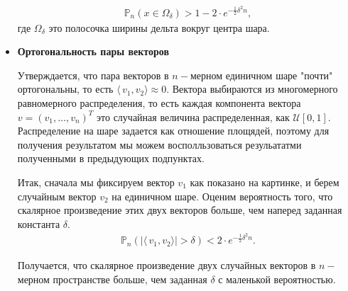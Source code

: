 \documentclass[12pt]{article}
\begin{document}
\begin{itemize}
\begin{eqnarray}
\mathbb{P}_n( x \in \Omega_{\delta}) > 1 - 2 \cdot e^{-\frac 1 2 \delta^2 n }, 
\end{eqnarray}
где $\Omega_{\delta}$ это полосочка ширины дельта вокруг центра шара.
\item {\bf Ортогональность пары векторов}
\par Утверждается, что пара векторов в $n-$мерном единичном шаре "почти" ортогональны, то есть $\langle\,v_1, v_2 \rangle \approx 0$.
 Вектора выбираются из многомерного равномерного распределения, то есть каждая компонента вектора $v = (v_1, \dots, v_n)^T$ это случайная величина распределенная, как $\mathcal{U}[0,1]$. 
Распределение на шаре задается как отношение площядей, поэтому для получения результатом мы можем восполльзоваться резульататми полученными в предыдующих подпунктах. 
\par Итак, сначала мы фиксируем вектор $v_1$ как показано на картинке, и берем случайным вектор $v_2$ на единичном шаре. Оценим вероятность того, что скалярное произведение этих двух векторов больше, чем наперед заданная константа $\delta$.
\begin{eqnarray}
\mathbb{P}_n(|\langle\, v_1, v_2 \rangle| > \delta) < 2 \cdot e^{-\frac 1 2 \delta^2 n}.
\end{eqnarray}
\begin{center}
\end{center}
Получается, что скалярное произведение двух случайных векторов в $n-$мерном пространстве больше, чем заданная $\delta$ с маленькой вероятностью. \\

\end{itemize}
\end{document}
